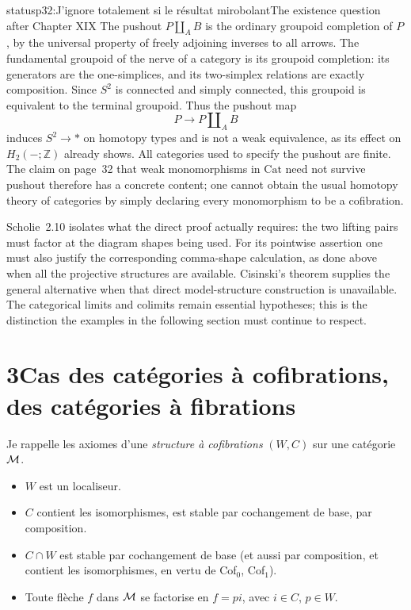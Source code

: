 \begin{dcomment}{status}{p32:J'ignore totalement si le résultat mirobolant}{The existence question after Chapter XIX}
The pushout $P\amalg_A B$ is the ordinary groupoid completion of $P$, by the universal property of freely adjoining inverses to all arrows. The fundamental groupoid of the nerve of a category is its groupoid completion: its generators are the one-simplices, and its two-simplex relations are exactly composition. Since $S^2$ is connected and simply connected, this groupoid is equivalent to the terminal groupoid. Thus the pushout map
\[
 P\longrightarrow P\amalg_A B
\]
induces $S^2\to *$ on homotopy types and is not a weak equivalence, as its effect on $H_2(-;\mathbb Z)$ already shows. All categories used to specify the pushout are finite. The claim on page~32 that weak monomorphisms in $\mathrm{Cat}$ need not survive pushout therefore has a concrete content; one cannot obtain the usual homotopy theory of categories by simply declaring every monomorphism to be a cofibration.

Scholie~2.10 isolates what the direct proof actually requires: the two lifting pairs must factor at the diagram shapes being used. For its pointwise assertion one must also justify the corresponding comma-shape calculation, as done above when all the projective structures are available. Cisinski's theorem supplies the general alternative when that direct model-structure construction is unavailable. The categorical limits and colimits remain essential hypotheses; this is the distinction the examples in the following section must continue to respect.
\end{dcomment}



\section*{3\quad Cas des catégories à cofibrations, des catégories à fibrations}

Je rappelle les axiomes d'une \textit{structure à cofibrations} $(W,C)$ sur une catégorie $\mathcal{M}$.

\begin{itemize}[leftmargin=4em,labelwidth=3.5em,align=left]
\item[Cof$_0$ :] $W$ est un localiseur.
\item[Cof$_1$ :] $C$ contient les isomorphismes, est stable par cochangement de base, par composition.
\item[Cof$_2$ :] $C\cap W$ est stable par cochangement de base (et aussi par composition, et contient les isomorphismes, en vertu de Cof$_0$, Cof$_1$).
\item[Cof$_3$ :] Toute flèche $f$ dans $\mathcal{M}$ se factorise en $f=pi$, avec $i\in C$, $p\in W$.
\end{itemize}

